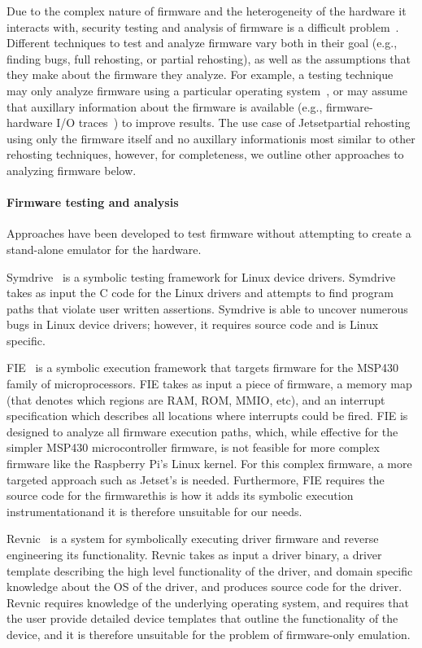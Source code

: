 Due to the complex nature of firmware and the heterogeneity of the hardware it interacts with, security testing and analysis of firmware is a difficult problem~\cite{muench2018you, wright2021challenges}.
Different techniques to test and analyze firmware vary both in their goal (e.g., finding bugs, full rehosting, or partial rehosting), as well as the assumptions that they make about the firmware they analyze.
For example, a testing technique may only analyze firmware using a particular operating system~\cite{firmadyne}, or may assume that auxillary information about the firmware is available (e.g., firmware-hardware I/O traces~\cite{pretender2019}) to improve results.
The use case of Jetset\textemdash partial rehosting using only the firmware itself and no auxillary information\textemdash is most similar to other rehosting techniques, however, for completeness, we outline other approaches to analyzing firmware below.

\paragraph{Firmware testing and analysis}
Approaches have been developed to test firmware without attempting to create a stand-alone emulator for the hardware.

Symdrive~\cite{symdrive} is a symbolic testing framework for Linux device drivers.
Symdrive takes as input the C code for the Linux drivers and attempts to find program paths that violate user written assertions. 
Symdrive is able to uncover numerous bugs in Linux device drivers; however, it requires source code and is Linux specific.

FIE~\cite{fie} is a symbolic execution framework that targets firmware for the
MSP430 family of microprocessors.
FIE takes as input a piece of firmware, a memory map (that denotes which regions are RAM, ROM, MMIO, etc), and an interrupt specification which describes all locations where interrupts could be fired. 
FIE is designed to analyze all firmware execution paths, which, while effective for the simpler MSP430 microcontroller firmware, is not feasible for more complex firmware like the Raspberry Pi's Linux kernel. 
For this complex firmware, a more targeted approach such as Jetset's is needed.
Furthermore, FIE requires the source code for the firmware\textemdash this is how it adds its symbolic execution instrumentation\textemdash and it is therefore unsuitable for our needs.

Revnic~\cite{revnic} is a system for symbolically executing driver firmware and reverse engineering its functionality.
Revnic takes as input a driver binary, a driver template describing the high level functionality of the driver, and domain specific knowledge about the OS of the driver, and produces source code for the driver.
Revnic requires knowledge of the underlying operating system, and requires that the user provide detailed device templates that outline the functionality of the device, and it is therefore unsuitable for the problem of firmware-only emulation.

